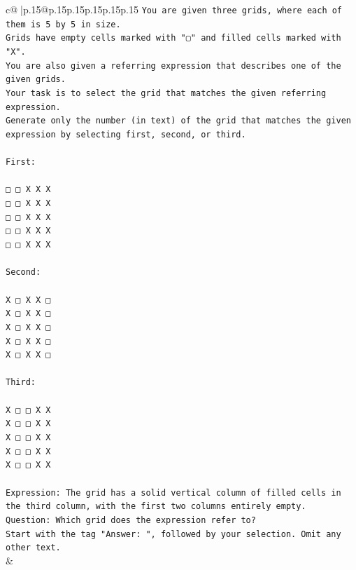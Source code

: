 \documentclass{article}
\begin{document}
{\begin{supertabular}{c@{$\;$}|p{.15\linewidth}@{}p{.15\linewidth}p{.15\linewidth}p{.15\linewidth}p{.15\linewidth}p{.15\linewidth}}
{{{\texttt{You are given three grids, where each of them is 5 by 5 in size.} \\
\texttt{Grids have empty cells marked with "▢" and filled cells marked with "X".} \\
\texttt{You are also given a referring expression that describes one of the given grids.} \\
\texttt{Your task is to select the grid that matches the given referring expression.} \\
\texttt{Generate only the number (in text) of the grid that matches the given expression by selecting first, second, or third.} \\
\\ 
\texttt{First:} \\
\\ 
\texttt{□ □ X X X} \\
\texttt{□ □ X X X} \\
\texttt{□ □ X X X} \\
\texttt{□ □ X X X} \\
\texttt{□ □ X X X} \\
\\ 
\texttt{Second:} \\
\\ 
\texttt{X □ X X □} \\
\texttt{X □ X X □} \\
\texttt{X □ X X □} \\
\texttt{X □ X X □} \\
\texttt{X □ X X □} \\
\\ 
\texttt{Third:} \\
\\ 
\texttt{X □ □ X X} \\
\texttt{X □ □ X X} \\
\texttt{X □ □ X X} \\
\texttt{X □ □ X X} \\
\texttt{X □ □ X X} \\
\\ 
\texttt{Expression: The grid has a solid vertical column of filled cells in the third column, with the first two columns entirely empty.} \\
\texttt{Question: Which grid does the expression refer to?} \\
\texttt{Start with the tag "Answer: ", followed by your selection. Omit any other text.} \\
            }
        }
    }
    & \\ \\


\end{supertabular}}
\end{document}
